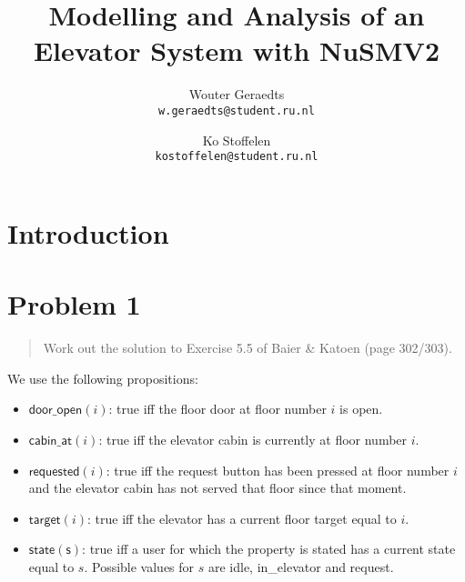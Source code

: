 \documentclass[a4paper,10pt]{article}
\title{Modelling and Analysis of an Elevator System with NuSMV2}
\author{
	Wouter Geraedts \\ \small{\texttt{w.geraedts@student.ru.nl}} \and
	Ko Stoffelen     \\ \small{\texttt{kostoffelen@student.ru.nl}}
}
\newcommand{\dooropen}[1]{\mathsf{door\_open}(#1)}
\newcommand{\cabinat}[1]{\mathsf{cabin\_at}(#1)}
\newcommand{\requested}[1]{\mathsf{requested}(#1)}
\newcommand{\target}[1]{\mathsf{target}(#1)}
\newcommand{\state}[1]{\mathsf{state}(\mathsf{#1})}
\begin{document}
	\maketitle


	\section{Introduction}

	
	\section{Problem 1}
	
	\begin{quote}
		Work out the solution to Exercise 5.5 of Baier \& Katoen (page 302/303).
	\end{quote}
	
	We use the following propositions:
	\begin{itemize}
		\item \(\dooropen{i}\): true iff the floor door at floor number \(i\) is open.
		\item \(\cabinat{i}\): true iff the elevator cabin is currently at floor number \(i\).
		\item \(\requested{i}\): true iff the request button has been pressed at floor number \(i\) and the elevator cabin has not served that floor since that moment.
		\item \(\target{i}\): true iff the elevator has a current floor target equal to \(i\).
		\item \(\state{s}\): true iff a user for which the property is stated has a current state equal to \(s\). Possible values for \(s\) are idle, in\_elevator and request.
	\end{itemize}
	
\end{document}
